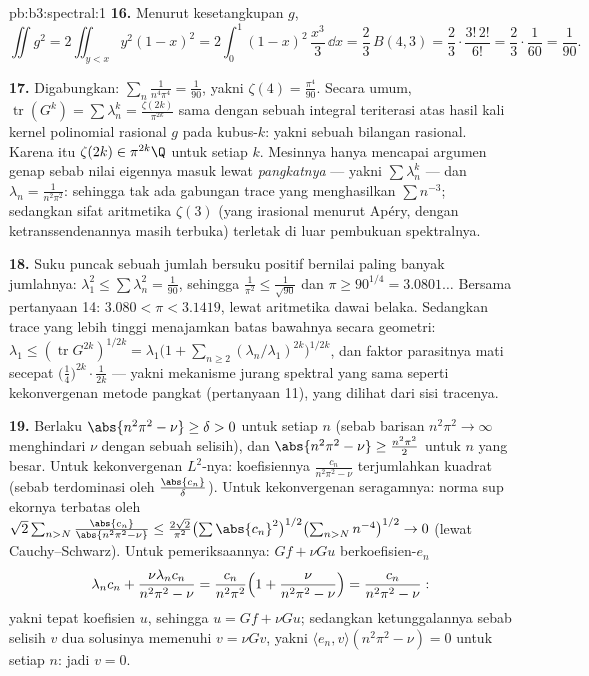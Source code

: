\begin{solution}{pb:b3:spectral:1}
\textbf{16.} Menurut kesetangkupan $g$,
\[
\iint g^2 = 2\iint_{y<x}y^2(1-x)^2
= 2\int_0^1(1-x)^2\,\frac{x^3}3\,\dd x
= \frac23\,B(4, 3) = \frac23\cdot\frac{3!\,2!}{6!}
= \frac23\cdot\frac1{60} = \frac1{90} .
\]

\textbf{17.} Digabungkan: $\sum_n\frac1{n^4\pi^4} =
\frac1{90}$, yakni $\zeta(4) = \frac{\pi^4}{90}$. Secara
umum, $\operatorname{tr}(G^k) = \sum\lambda_n^k =
\frac{\zeta(2k)}{\pi^{2k}}$ sama dengan sebuah integral teriterasi atas
hasil kali kernel polinomial rasional $g$ pada
kubus-$k$: yakni sebuah bilangan rasional. Karena itu $\zeta(2k) \in
\pi^{2k}\Q$ untuk setiap $k$. Mesinnya hanya mencapai argumen
genap sebab nilai eigennya masuk lewat \emph{pangkatnya}
--- yakni $\sum\lambda_n^k$ --- dan $\lambda_n =
\frac1{n^2\pi^2}$: sehingga tak ada gabungan trace yang menghasilkan $\sum
n^{-3}$; sedangkan sifat aritmetika $\zeta(3)$ (yang irasional menurut
Apéry, dengan ketranssendenannya masih terbuka) terletak di luar
pembukuan spektralnya.

\textbf{18.} Suku puncak sebuah jumlah bersuku positif bernilai paling
banyak jumlahnya: $\lambda_1^2 \leq \sum\lambda_n^2 =
\frac1{90}$, sehingga $\frac1{\pi^2} \leq \frac1{\sqrt{90}}$ dan
$\pi \geq 90^{1/4} = 3.0801\ldots$ Bersama pertanyaan 14:
$3.080 < \pi < 3.1419$, lewat aritmetika dawai belaka. Sedangkan trace
yang lebih tinggi menajamkan batas bawahnya secara geometri:
$\lambda_1 \leq (\operatorname{tr}G^{2k})^{1/2k} =
\lambda_1\bigl(1 + \sum_{n\geq2}(\lambda_n/\lambda_1)^{2k}
\bigr)^{1/2k}$, dan faktor parasitnya mati secepat
$\bigl(\tfrac14\bigr)^{2k}\cdot\frac1{2k}$ --- yakni mekanisme
jurang spektral yang sama seperti kekonvergenan metode pangkat
(pertanyaan 11), yang dilihat dari sisi tracenya.

\textbf{19.} Berlaku $\abs{n^2\pi^2 - \nu} \geq \delta > 0$ untuk setiap
$n$ (sebab barisan $n^2\pi^2 \to \infty$ menghindari $\nu$ dengan sebuah
selisih), dan $\abs{n^2\pi^2 - \nu} \geq \frac{n^2\pi^2}2$
untuk $n$ yang besar. Untuk kekonvergenan $L^2$-nya: koefisiennya
$\frac{c_n}{n^2\pi^2 - \nu}$ terjumlahkan kuadrat (sebab terdominasi
oleh $\frac{\abs{c_n}}\delta$). Untuk kekonvergenan seragamnya: norma sup
ekornya terbatas oleh $\sqrt2\sum_{n>N}
\frac{\abs{c_n}}{\abs{n^2\pi^2 - \nu}} \leq
\frac{2\sqrt2}{\pi^2}\bigl(\sum\abs{c_n}^2\bigr)^{1/2}
\bigl(\sum_{n>N}n^{-4}\bigr)^{1/2} \to 0$ (lewat Cauchy--Schwarz).
Untuk pemeriksaannya: $Gf + \nu Gu$ berkoefisien-$e_n$
\[
\lambda_nc_n + \frac{\nu\lambda_nc_n}{n^2\pi^2 - \nu}
= \frac{c_n}{n^2\pi^2}\Bigl(1 + \frac{\nu}{n^2\pi^2 -
\nu}\Bigr) = \frac{c_n}{n^2\pi^2 - \nu} :
\]
yakni tepat
koefisien $u$, sehingga $u = Gf + \nu Gu$; sedangkan ketunggalannya
sebab selisih $v$ dua solusinya memenuhi $v = \nu
Gv$, yakni $\langle e_n, v\rangle(n^2\pi^2 - \nu) = 0$ untuk
setiap $n$: jadi $v = 0$.


\end{solution}

